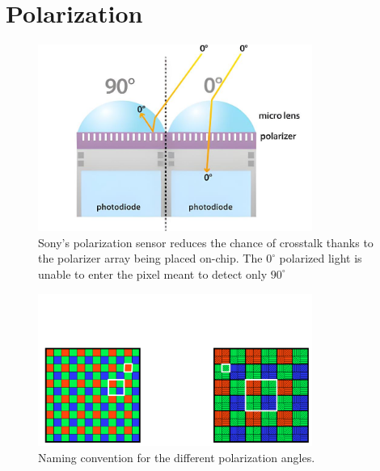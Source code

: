 \section{Polarization}

\begin{figure}
    \centering
    \includegraphics[width=0.8\textwidth]{figures/crosstalk_off_upscaled.jpg}
    \caption{Sony's polarization sensor reduces the chance of crosstalk thanks to the polarizer array being placed on-chip. The $0^{\circ}$ polarized light is unable to enter the pixel meant to detect only $90^{\circ}$ \cite{lucidvisionlabsPolarizationExplainedSony2018}}
    \label{fig:camera_no_crosstalk}
\end{figure}

\begin{figure}
    \centering
    \includegraphics[width=0.8\textwidth]{figures/polarized_image/naming.pdf}
    \caption{Naming convention for the different polarization angles.}
    \label{fig:polarization_naming}
\end{figure}
